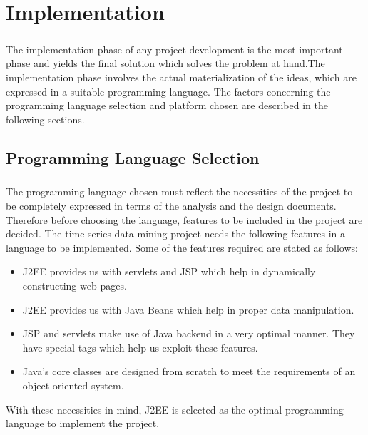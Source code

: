 \documentclass[12pt,a4paper]{report}
\begin{document}
\chapter{Implementation}
\pagestyle{fancy}
\chead{}
\rfoot{\small{\thepage}}
\renewcommand{\headrulewidth}{0.4pt}
\renewcommand{\footrulewidth}{0.4pt}
\paragraph{}The implementation phase of any project development is the most important phase and yields the final solution which solves the problem at hand.The implementation phase involves the actual materialization of the ideas, which are expressed in a suitable programming language. The factors concerning the programming language selection and platform chosen are described in the following sections.
\section{Programming Language Selection}

\paragraph{}The programming language chosen must reflect the necessities of the project to be completely expressed in terms of the analysis and the design documents. Therefore before choosing the language, features to be included in the project are decided. The time series data mining project needs the following features in a language to be implemented. Some of the features required are stated as follows:
\begin{itemize}
\item J2EE provides us with servlets and JSP which help in dynamically constructing web pages.
\item J2EE provides us with Java Beans which help in proper data manipulation.
\item JSP and servlets make use of Java backend in a very optimal manner. They have special tags which help us exploit these features.
\item Java's core classes are designed from scratch to meet the requirements of an object oriented system.
\end{itemize} 
With these necessities in mind, J2EE is selected as the optimal programming language to implement the project.
\end{document}
